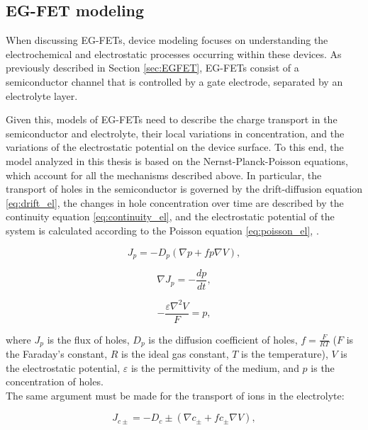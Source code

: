 \subsection{EG-FET modeling}
\label{sec:EGFET_model}

When discussing EG-FETs, device modeling focuses on understanding the electrochemical and electrostatic processes occurring within these devices. As previously described in Section \ref{sec:EGFET}, EG-FETs consist of a semiconductor channel that is controlled by a gate electrode, separated by an electrolyte layer.

Given this, models of EG-FETs need to describe the charge transport in the semiconductor and electrolyte, their local variations in concentration, and the variations of the electrostatic potential on the device surface. To this end, the model analyzed in this thesis is based on the Nernst-Planck-Poisson equations, which account for all the mechanisms described above. In particular, the transport of holes in the semiconductor is governed by the drift-diffusion equation \eqref{eq:drift_el}, the changes in hole concentration over time are described by the continuity equation \eqref{eq:continuity_el}, and the electrostatic potential of the system is calculated according to the Poisson equation \eqref{eq:poisson_el}, \citep{delavariNernst2021}.

\begin{equation}
    \label{eq:drift_el}
    J_p = -D_p\left(\nabla p + fp\nabla V \right),
\end{equation}

\begin{equation}
    \label{eq:continuity_el}
    \nabla J_p = -\dfrac{dp}{dt},
\end{equation}

\begin{equation}
    \label{eq:poisson_el}
    -\dfrac{\varepsilon\nabla^2V}{F} = p,
\end{equation}

where $J_p$ is the flux of holes, $D_p$ is the diffusion coefficient of holes, $f=\frac{F}{RT}$ ($F$ is the Faraday's constant, $R$ is the ideal gas constant, $T$ is the temperature), $V$ is the electrostatic potential, $\varepsilon$ is the permittivity of the medium, and $p$ is the concentration of holes. \\
The same argument must be made for the transport of ions in the electrolyte:

\begin{equation}
    \label{eq:drift_ion}
    J_{c\pm} = -D_c\pm\left(\nabla c_{\pm} + fc_{\pm}\nabla V \right),
\end{equation}

